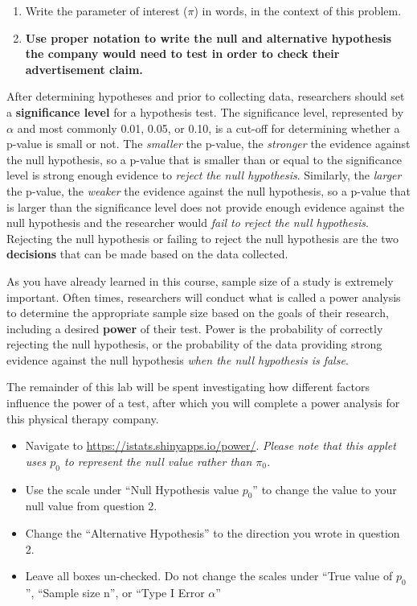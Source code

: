 \documentclass[
]{report}
\begin{document}
\begin{enumerate}
\def\labelenumi{\arabic{enumi}.}
\item
  Write the parameter of interest (\(\pi\)) in words, in the context of this problem.
  \vspace{0.5in}
\item
  \textbf{Use proper notation to write the null and alternative hypothesis the company would need to test in order to check their advertisement claim.}
  \vspace{0.5in}
\end{enumerate}

After determining hypotheses and prior to collecting data, researchers should set a \textbf{significance level} for a hypothesis test. The significance level, represented by \(\alpha\) and most commonly 0.01, 0.05, or 0.10, is a cut-off for determining whether a p-value is small or not. The \emph{smaller} the p-value, the \emph{stronger} the evidence against the null hypothesis, so a p-value that is smaller than or equal to the significance level is strong enough evidence to \emph{reject the null hypothesis}. Similarly, the \emph{larger} the p-value, the \emph{weaker} the evidence against the null hypothesis, so a p-value that is larger than the significance level does not provide enough evidence against the null hypothesis and the researcher would \emph{fail to reject the null hypothesis}. Rejecting the null hypothesis or failing to reject the null hypothesis are the two \textbf{decisions} that can be made based on the data collected.

As you have already learned in this course, sample size of a study is extremely important. Often times, researchers will conduct what is called a power analysis to determine the appropriate sample size based on the goals of their research, including a desired \textbf{power} of their test. Power is the probability of correctly rejecting the null hypothesis, or the probability of the data providing strong evidence against the null hypothesis \emph{when the null hypothesis is false}.

The remainder of this lab will be spent investigating how different factors influence the power of a test, after which you will complete a power analysis for this physical therapy company.

\begin{itemize}
\item
  Navigate to \url{https://istats.shinyapps.io/power/}. \emph{Please note that this applet uses \(p_0\) to represent the null value rather than \(\pi_0\).}
\item
  Use the scale under ``Null Hypothesis value \(p_0\)'' to change the value to your null value from question 2.
\item
  Change the ``Alternative Hypothesis'' to the direction you wrote in question 2.
\item
  Leave all boxes un-checked. Do not change the scales under ``True value of \(p_0\)'', ``Sample size n'', or ``Type I Error \(\alpha\)''
\end{itemize}
\end{document}
